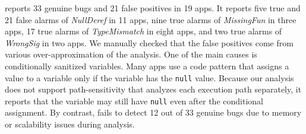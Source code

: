 \ours reports 33 genuine bugs and 21 false positives in 19 apps.
It reports five true and 21 false alarms of {\it NullDeref} in 11 apps,
nine true alarms of {\it MissingFun} in three apps,
17 true alarms of {\it TypeMismatch} in eight apps, and
two true alarms of {\it WrongSig} in two apps.
We manually checked that the false positives come from various over-approximation
of the analysis. One of the main causes is conditionally sanitized variables.  Many apps
use a code pattern that assigns a value to a variable only if the variable has
the {\tt null} value. Because our analysis does not support
path-sensitivity that analyzes each execution path separately, it reports that
the variable may still have {\tt null} even after the conditional assignment.
By contrast, \lees fails to detect 12 out of 33 genuine bugs
due to memory or scalability issues during analysis.

